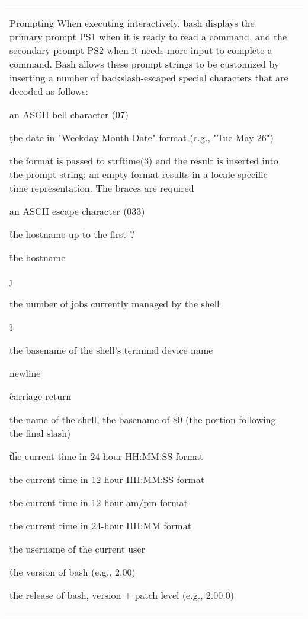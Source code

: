 \documentclass[11pt]{article}
\begin{document}
\begin{longtable}{p{}p{}}
{{{Prompting
When executing interactively, bash displays the primary prompt PS1 when it is ready to read a command, and the secondary prompt PS2 when it needs more input to complete a command. Bash allows these prompt strings to be customized by inserting a number of backslash-escaped special characters that are decoded as follows:

\a
an ASCII bell character (07)

\d

the date in "Weekday Month Date" format (e.g., "Tue May 26")

\D{format}
the format is passed to strftime(3) and the result is inserted into the prompt string; an empty format results in a locale-specific time representation. The braces are required

\e
an ASCII escape character (033)

\h

the hostname up to the first '.'

\H

the hostname

\j

the number of jobs currently managed by the shell

\l

the basename of the shell's terminal device name

\n

newline

\r

carriage return

\s

the name of the shell, the basename of \$0 (the portion following the final slash)

\t

the current time in 24-hour HH:MM:SS format

\T

the current time in 12-hour HH:MM:SS format

\@

the current time in 12-hour am/pm format

\A

the current time in 24-hour HH:MM format

\u

the username of the current user

\v

the version of bash (e.g., 2.00)

\V

the release of bash, version + patch level (e.g., 2.00.0)

}}}
\end{longtable}
\end{document}
